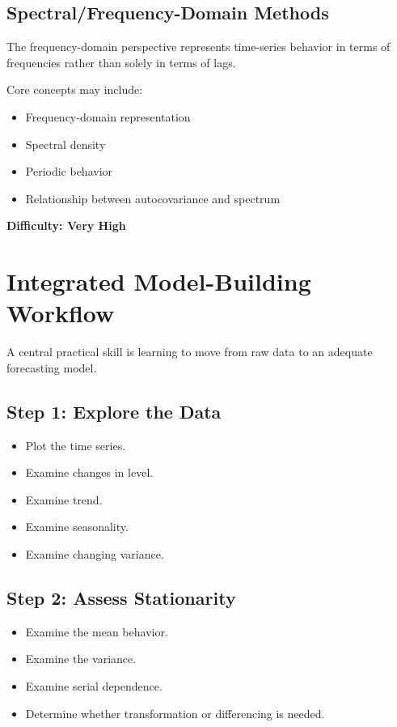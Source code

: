 \documentclass[11pt]{article}
\begin{document}
\subsection{Spectral/Frequency-Domain Methods}

The frequency-domain perspective represents time-series behavior
in terms of frequencies rather than solely in terms of lags.

Core concepts may include:

\begin{itemize}
    \item Frequency-domain representation
    \item Spectral density
    \item Periodic behavior
    \item Relationship between autocovariance and spectrum
\end{itemize}

\textbf{Difficulty: Very High}

\section{Integrated Model-Building Workflow}

A central practical skill is learning to move from raw data to an
adequate forecasting model.

\subsection*{Step 1: Explore the Data}

\begin{itemize}
    \item Plot the time series.
    \item Examine changes in level.
    \item Examine trend.
    \item Examine seasonality.
    \item Examine changing variance.
\end{itemize}

\subsection*{Step 2: Assess Stationarity}

\begin{itemize}
    \item Examine the mean behavior.
    \item Examine the variance.
    \item Examine serial dependence.
    \item Determine whether transformation or differencing is needed.
\end{itemize}
\end{document}
